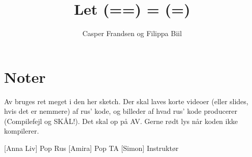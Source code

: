 \documentclass{article}
\title{Let (==) = (=)}                   %
\author{Casper Frandsen og Filippa Biil}  %
\begin{document}
                
\maketitle
\section*{Noter}   
Av bruges ret meget i den her sketch. Der skal laves korte videoer (eller slides, hvis det er nemmere) af rus' kode, og billeder af hvad rus' kode producerer (Compilefejl og SKÅL!). Det skal op på AV. Gerne rødt lys når koden ikke kompilerer.

\begin{roles}
[Anna Liv] Pop Rus
[Amira] Pop TA
[Simon] Instruktør
\end{roles}

\begin{props}
\end{props}
\end{document}
